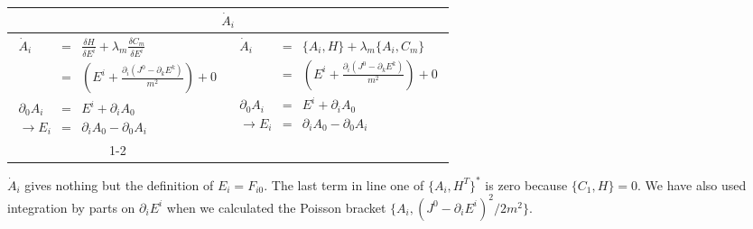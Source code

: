 \documentclass[aps,preprint,preprintnumbers,nofootinbib,showpacs,prd]{revtex4-1}
\newcommand{\ba}{\begin{array}}
\newcommand{\ea}{\end{array}}
\begin{document}
\begin{center}
    \begin{tabular}{ | c  c |}
    \hline
    \multicolumn{2}{|c|}{$\dot A_i$} \\
    \hline
    $\ba {rcl}
\dot A_i & = & \frac{\delta H}{\delta E^i} + \lambda_m \frac{\delta C_m}{\delta E^i} \\
& = & \left (E^i + \frac{\partial_i(J^0 - \partial_k E^k)}{m^2} \right ) + 0 \\
\partial_0 A_i & = & E^i + \partial_i A_0 \\
\to E_i & = & \partial_i A_0 - \partial_0 A_i
\ea$
     &
    $\ba {rcl}
\dot A_i & = & \{A_i, H\} + \lambda_m \{A_i, C_m\} \\
& = & \left (E^i + \frac{\partial_i(J^0 - \partial_k E^k)}{m^2} \right ) + 0 \\
\partial_0 A_i & = & E^i + \partial_i A_0 \\
\to E_i & = & \partial_i A_0 - \partial_0 A_i
\ea$
      \\ \cline{1-2}
    \multicolumn{2}{|c|}{
   $\ba {rcl}
\{A_i, H^T\}^* & = & \{A_i, H\} - \{A_i, C_1\}\{C_1, C_2\}^{-1}\{C_2, H\} - \{A_i, C_2\}\{C_2, C_1\}^{-1}\{C_1, H\} \\
& = & \left (E^i + \frac{\partial_i(J^0 - \partial_k E^k)}{m^2} \right ) - 0 - 0 \\
\partial_0 A_i & = & E^i + \partial_i A_0 \\
\to E_i & = & \partial_i A_0 - \partial_0 A_i
\ea$
    } \\
    \hline
    \end{tabular}
\end{center}
%
$\dot A_i$ gives nothing but the definition of $E_i = F_{i0}$. The last term in line one of $\{A_i, H^T\}^*$ is zero because $\{C_1, H\} = 0$.  We have also used integration by parts on $\partial_i E^i$ when we calculated the Poisson bracket $\{A_i, (J^0 - \partial_i E^{i})^2/2 m^2\}$.
\end{document}
